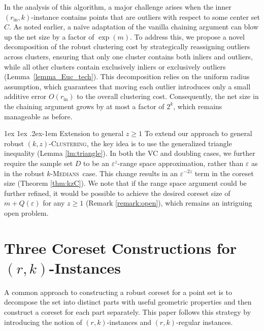 \documentclass[11pt,letterpaper]{article}
\makeatletter
\renewcommand{\paragraph}{%
  \@startsection{paragraph}{4}%
  {\z@}{1ex \@plus 1ex \@minus .2ex}{-1em}%
  {\normalfont\normalsize\bfseries}%
}
\theoremstyle{definition}
\newcommand{\eps}{\varepsilon}
\renewcommand{\epsilon}{\varepsilon}
\newcommand{\inn}{{\mathrm{in}}}
\newcommand{\ProblemName}[1]{\textsc{#1}}
\newcommand{\kzC}{\ProblemName{$(k, z)$-Clustering}\xspace}
\newcommand{\kMedian}{\ProblemName{$k$-Medians}\xspace}
\makeatother
\begin{document}
In the analysis of this algorithm, a major challenge arises when the inner \((r_{\inn},k)\)-instance contains points that are outliers with respect to some center set \(C\). 
%
As noted earlier, a na\"ive adaptation of the vanilla chaining argument can blow up the net size by a factor of \(\exp(m)\). 
%
To address this, we propose a novel decomposition of the robust clustering cost by strategically reassigning outliers across clusters, ensuring that only one cluster contains both inliers and outliers, while all other clusters contain exclusively inliers or exclusively outliers (Lemma~\ref{lemma_Euc_tech}).
%
This decomposition relies on the uniform radius assumption, which guarantees that moving each outlier introduces only a small additive error $O(r_{\inn})$ to the overall clustering cost.
%
Consequently, the net size in the chaining argument grows by at most a factor of \(2^k\), which remains manageable as before.

\paragraph{Extension to general $z\geq 1$}
To extend our approach to general robust \kzC, the key idea is to use the generalized triangle inequality (Lemma \ref{lm:triangle}). 
%
In both the VC and doubling cases, we further require the sample set \(D\) to be an \(\epsilon^z\)-range space approximation, rather than \(\epsilon\) as in the robust \kMedian\ case. This change results in an \(\epsilon^{-2z}\) term in the coreset size (Theorem \ref{thm:kzC}). 
%
We note that if the range space argument could be further refined, it would be possible to achieve the desired coreset size of \(m + Q(\eps)\) for any \(z \ge 1\) (Remark \ref{remark:open}), which remains an intriguing open problem.%
\section{Three Coreset Constructions for $(r,k)$-Instances}
\label{sec:three_coresets}

A common approach to constructing a robust coreset for a point set is to decompose the set into distinct parts with useful geometric properties and then construct a coreset for each part separately.  
%
This paper follows this strategy by introducing the notion of \( (r,k) \)-instances and \( (r,k) \)-regular instances.  
%
\end{document}
